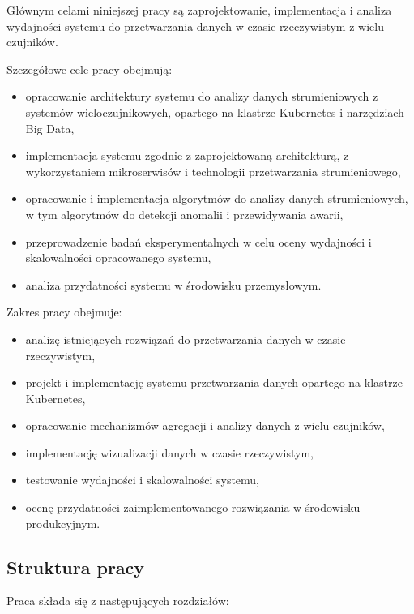 Głównym celami niniejszej pracy są zaprojektowanie, implementacja i analiza wydajności systemu do przetwarzania danych w
czasie rzeczywistym z wielu czujników.

Szczegółowe cele pracy obejmują:
\begin{itemize}
    \item opracowanie architektury systemu do analizy danych strumieniowych z systemów wieloczujnikowych, opartego na klastrze Kubernetes i narzędziach Big Data,
    \item implementacja systemu zgodnie z zaprojektowaną architekturą, z wykorzystaniem mikroserwisów i technologii przetwarzania strumieniowego,
    \item opracowanie i implementacja algorytmów do analizy danych strumieniowych, w tym algorytmów do detekcji anomalii i przewidywania awarii,
    \item przeprowadzenie badań eksperymentalnych w celu oceny wydajności i skalowalności opracowanego systemu,
    \item analiza przydatności systemu w środowisku przemysłowym.
\end{itemize}

Zakres pracy obejmuje:
\begin{itemize}
    \item analizę istniejących rozwiązań do przetwarzania danych w czasie rzeczywistym,
    \item projekt i implementację systemu przetwarzania danych opartego na klastrze Kubernetes,
    \item opracowanie mechanizmów agregacji i analizy danych z wielu czujników,
    \item implementację wizualizacji danych w czasie rzeczywistym,
    \item testowanie wydajności i skalowalności systemu,
    \item ocenę przydatności zaimplementowanego rozwiązania w środowisku produkcyjnym.
\end{itemize}

\subsection{Struktura pracy}
\label{subsec:struktura}

Praca składa się z następujących rozdziałów:

